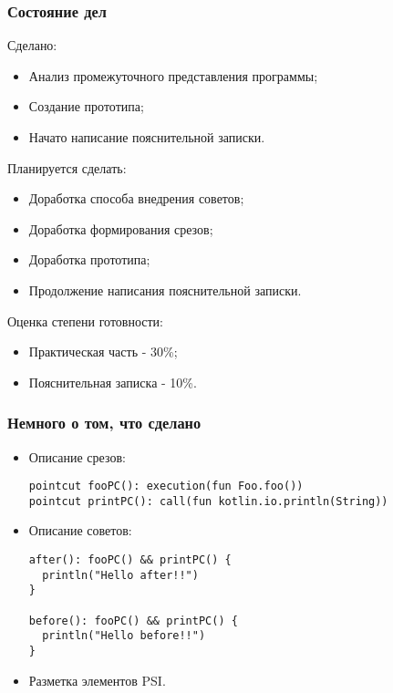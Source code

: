 \documentclass{beamer}
\begin{document}
	\begin{frame}
		\frametitle{Состояние дел}
        Сделано:
		\begin{itemize}
            \item Анализ промежуточного представления программы;
            \item Создание прототипа;
            \item Начато написание пояснительной записки.
        \end{itemize}

        Планируется сделать:
        \begin{itemize}
            \item Доработка способа внедрения советов;
            \item Доработка формирования срезов;
            \item Доработка прототипа;
            \item Продолжение написания пояснительной записки.
        \end{itemize}
        Оценка степени готовности:
        \begin{itemize}
            \item Практическая часть - 30\%;
            \item Пояснительная записка - 10\%.
        \end{itemize}
    \end{frame}

    \begin{frame}[fragile=singleslide]
    	\frametitle{Немного о том, что сделано}
    	\begin{itemize}
    		\item Описание срезов:
    			\begin{verbatim}
pointcut fooPC(): execution(fun Foo.foo())
pointcut printPC(): call(fun kotlin.io.println(String))
    			\end{verbatim}
    		\item Описание советов:
    			\begin{verbatim}
after(): fooPC() && printPC() {
  println("Hello after!!")
}

before(): fooPC() && printPC() {
  println("Hello before!!")
}
    			\end{verbatim}
    		\item Разметка элементов PSI.
    	\end{itemize}
    \end{frame}
\end{document}
